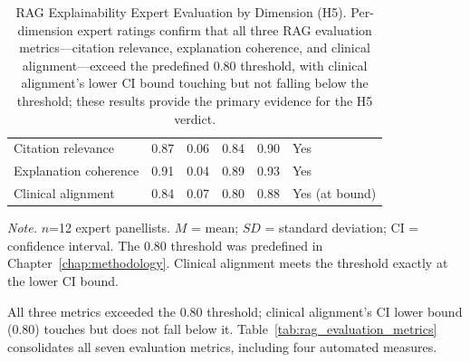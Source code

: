 \begin{table}[H]
\tablestripes\tablefontsize
\caption[RAG Explainability Expert Evaluation by Dimension (H5)]{RAG Explainability Expert Evaluation by Dimension (H5). Per-dimension expert ratings confirm that all three RAG evaluation metrics---citation relevance, explanation coherence, and clinical alignment---exceed the predefined 0.80 threshold, with clinical alignment's lower CI bound touching but not falling below the threshold; these results provide the primary evidence for the H5 verdict.}
\tablefontsize
\begin{tabularx}{\textwidth}{@{} >{\raggedright\arraybackslash}p{3.2cm} C C C C L @{}}
\toprule
{} &  &  &  &  &  \\
\midrule
Citation relevance & 0.87 & 0.06 & 0.84 & 0.90 & Yes \\
Explanation coherence & 0.91 & 0.04 & 0.89 & 0.93 & Yes \\
Clinical alignment & 0.84 & 0.07 & 0.80 & 0.88 & Yes (at bound) \\
\bottomrule
\end{tabularx}
\vspace{0.5em}\noindent\textit{Note.} $n$=12 expert panellists. $M$ = mean; $SD$ = standard deviation; CI = confidence interval. The 0.80 threshold was predefined in Chapter~\ref{chap:methodology}. Clinical alignment meets the threshold exactly at the lower CI bound.
\end{table}

All three metrics exceeded the 0.80 threshold; clinical alignment's CI lower bound (0.80) touches but does not fall below it. Table~\ref{tab:rag_evaluation_metrics} consolidates all seven evaluation metrics, including four automated measures.

